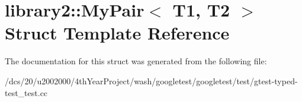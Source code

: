 \hypertarget{structlibrary2_1_1MyPair}{}\section{library2\+:\+:My\+Pair$<$ T1, T2 $>$ Struct Template Reference}
\label{structlibrary2_1_1MyPair}


The documentation for this struct was generated from the following file\+:\begin{DoxyCompactItemize}
\item 
/dcs/20/u2002000/4th\+Year\+Project/wash/googletest/googletest/test/gtest-\/typed-\/test\+\_\+test.\+cc\end{DoxyCompactItemize}
